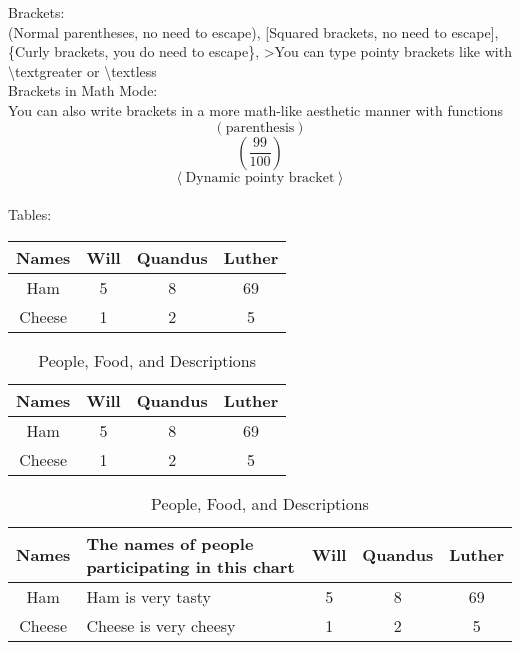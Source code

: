 \documentclass[12pt]{article}
\begin{document}
Brackets: \\[5pt]
(Normal parentheses, no need to escape), [Squared brackets, no need to escape], \{Curly brackets, you do need to escape\}, \textgreater You can type pointy brackets like with \textbackslash textgreater or \textbackslash textless \\[5pt]

Brackets in Math Mode: \\[5pt]
You can also write brackets in a more math-like aesthetic manner with functions \\[5pt]
$${ \left( \text{parenthesis} \right)}$$
$${ \left( \frac{99}{100} \right)}$$
$${ \left< \text{Dynamic pointy bracket} \right> }$$ \\[5pt]

Tables: \\[5pt]
\begin{center}
    \begin{tabular}{|c||c|c|c|}
        \hline
        Names & Will & Quandus & Luther \\ \hline
        Ham & 5 & 8 & 69 \\ \hline
        Cheese & 1 & 2 & 5 \\ \hline
    \end{tabular} \vspace{20pt}
\end{center} \vspace{10pt}

\begin{table}[H]
    \centering
    \def\arraystretch{1.5} %

    \begin{tabular}{|c||c|c|c|}
        \hline
        Names & Will & Quandus & Luther \\ \hline
        Ham & 5 & 8 & 69 \\ \hline
        Cheese & 1 & 2 & 5 \\ \hline
    \end{tabular}
    \caption{People and Food}
    \vspace{20pt}

    \begin{tabular}{|c||p{1in}|c|c|c|}
        \hline
        Names & The names of people participating in this chart & Will & Quandus & Luther \\ \hline
        Ham & Ham is very tasty & 5 & 8 & 69 \\ \hline
        Cheese & Cheese is very cheesy & 1 & 2 & 5 \\ \hline
    \end{tabular} 
    \caption{People, Food, and Descriptions}
    \vspace{20pt}
\end{table} \vspace{10pt}
\end{document}
